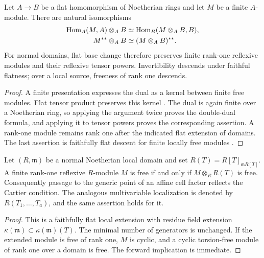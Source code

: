 \begin{lemma}\label{alg:flat}
Let $A\to B$ be a flat homomorphism of Noetherian rings and let $M$ be a finite $A$-module. There are natural isomorphisms
\[
 \begin{aligned}
 \operatorname{Hom}_A(M,A)\otimes_A B&\simeq\operatorname{Hom}_B(M\otimes_A B,B),\\
 M^{**}\otimes_A B&\simeq(M\otimes_A B)^{**}.
 \end{aligned}
\]
For normal domains, flat base change therefore preserves finite rank-one reflexive modules and their reflexive tensor powers. Invertibility descends under faithful flatness; over a local source, freeness of rank one descends.
\end{lemma}
\begin{proof}
A finite presentation expresses the dual as a kernel between finite free modules. Flat tensor product preserves this kernel \cite[Tag 0C6I]{The26}. The dual is again finite over a Noetherian ring, so applying the argument twice proves the double-dual formula, and applying it to tensor powers proves the corresponding assertion. A rank-one module remains rank one after the indicated flat extension of domains. The last assertion is faithfully flat descent for finite locally free modules \cite[Tag 05B2]{The26}.
\end{proof}

\begin{lemma}\label{alg:generic}
Let $(R,\mathfrak m)$ be a normal Noetherian local domain and set $R(T)=R[T]_{\mathfrak mR[T]}$. A finite rank-one reflexive $R$-module $M$ is free if and only if $M\otimes_RR(T)$ is free. Consequently passage to the generic point of an affine cell factor reflects the Cartier condition. The analogous multivariable localization is denoted by $R(T_1,\ldots,T_a)$, and the same assertion holds for it.
\end{lemma}
\begin{proof}
This is a faithfully flat local extension with residue field extension $\kappa(\mathfrak m)\subset\kappa(\mathfrak m)(T)$. The minimal number of generators is unchanged. If the extended module is free of rank one, $M$ is cyclic, and a cyclic torsion-free module of rank one over a domain is free. The forward implication is immediate.
\end{proof}

